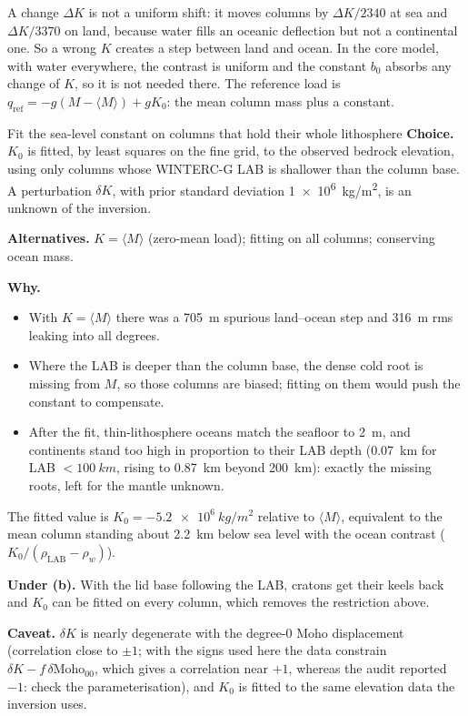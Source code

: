 A change $\Delta K$ is not a uniform shift: it moves columns by $\Delta K/2340$ at sea and $\Delta K/3370$ on land, because water fills an oceanic deflection but not a continental one.
So a wrong $K$ creates a step between land and ocean.
In the core model, with water everywhere, the contrast is uniform and the constant $b_0$ absorbs any change of $K$, so it is not needed there.
The reference load is $q_{\mathrm{ref}} = -g(M - \langle M\rangle) + gK_0$: the mean column mass plus a constant.

\begin{decision}{Fit the sea-level constant on columns that hold their whole lithosphere}
\textbf{Choice.} $K_0$ is fitted, by least squares on the fine grid, to the observed bedrock elevation, using only columns whose WINTERC-G LAB is shallower than the column base.
A perturbation $\delta K$, with prior standard deviation \qty{1e6}{kg/m^2}, is an unknown of the inversion.

\textbf{Alternatives.} $K = \langle M\rangle$ (zero-mean load); fitting on all columns; conserving ocean mass.

\textbf{Why.}
\begin{itemize}[nosep]
\item With $K = \langle M\rangle$ there was a \qty{705}{m} spurious land--ocean step and \qty{316}{m} rms leaking into all degrees.
\item Where the LAB is deeper than the column base, the dense cold root is missing from $M$, so those columns are biased; fitting on them would push the constant to compensate.
\item After the fit, thin-lithosphere oceans match the seafloor to \qty{2}{m}, and continents stand too high in proportion to their LAB depth (\qty{+0.07}{km} for LAB $<\qty{100}{km}$, rising to \qty{+0.87}{km} beyond \qty{200}{km}): exactly the missing roots, left for the mantle unknown.
\end{itemize}
The fitted value is $K_0 = \qty{-5.2e6}{kg/m^2}$ relative to $\langle M\rangle$, equivalent to the mean column standing about \qty{2.2}{km} below sea level with the ocean contrast ($K_0/(\rho_{\mathrm{LAB}}-\rho_w)$).

\textbf{Under (b).} With the lid base following the LAB, cratons get their keels back and $K_0$ can be fitted on every column, which removes the restriction above.

\textbf{Caveat.} $\delta K$ is nearly degenerate with the degree-0 Moho displacement (correlation close to $\pm1$; with the signs used here the data constrain $\delta K - f\,\delta\mathrm{Moho}_{00}$, which gives a correlation near $+1$, whereas the audit reported $-1$: check the parameterisation), and $K_0$ is fitted to the same elevation data the inversion uses.
\end{decision}

